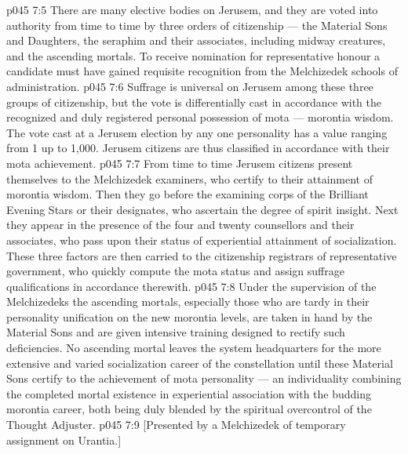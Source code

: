 \vs p045 7:5 \pc There are many elective bodies on Jerusem, and they are voted into authority from time to time by three orders of citizenship --- the Material Sons and Daughters, the seraphim and their associates, including midway creatures, and the ascending mortals. To receive nomination for representative honour a candidate must have gained requisite recognition from the Melchizedek schools of administration.
\vs p045 7:6 Suffrage is universal on Jerusem among these three groups of citizenship, but the vote is differentially cast in accordance with the recognized and duly registered personal possession of mota --- morontia wisdom. The vote cast at a Jerusem election by any one personality has a value ranging from 1 up to 1,000. Jerusem citizens are thus classified in accordance with their mota achievement.
\vs p045 7:7 From time to time Jerusem citizens present themselves to the Melchizedek examiners, who certify to their attainment of morontia wisdom. Then they go before the examining corps of the Brilliant Evening Stars or their designates, who ascertain the degree of spirit insight. Next they appear in the presence of the four and twenty counsellors and their associates, who pass upon their status of experiential attainment of socialization. These three factors are then carried to the citizenship registrars of representative government, who quickly compute the mota status and assign suffrage qualifications in accordance therewith.
\vs p045 7:8 \pc Under the supervision of the Melchizedeks the ascending mortals, especially those who are tardy in their personality unification on the new morontia levels, are taken in hand by the Material Sons and are given intensive training designed to rectify such deficiencies. No ascending mortal leaves the system headquarters for the more extensive and varied socialization career of the constellation until these Material Sons certify to the achievement of mota personality --- an individuality combining the completed mortal existence in experiential association with the budding morontia career, both being duly blended by the spiritual overcontrol of the Thought Adjuster.
\vsetoff
\vs p045 7:9 [Presented by a Melchizedek of temporary assignment on Urantia.]
\quizlink
